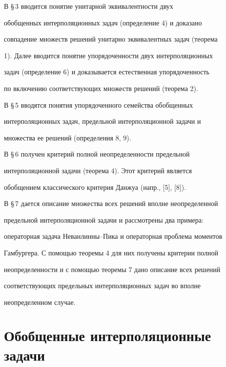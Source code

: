 В \S\,3 вводится понятие унитарной эквивалентности двух


обобщенных интерполяционных задач (определение 4) и доказано


совпадение множеств решений унитарно эквивалентных задач (теорема


1). Далее вводится понятие упорядоченности двух интерполяционных


задач (определение 6) и доказывается естественная упорядоченность


по включению соответствующих множеств решений (теорема 2).





В \S\,5 вводятся понятия упорядоченного семейства обобщенных


интерполяционных задач, предельной интерполяционной задачи и


множества ее решений (определения 8, 9).





В \S\,6 получен критерий полной неопределенности предельной


интерполяционной задачи (теорема 4). Этот критерий является


обобщением классического критерия Данжуа (напр., [5], [8]).





В \S\,7 дается описание множества всех решений вполне неопределенной


предельной интерполяционной задачи и рассмотрены два примера:


операторная задача Неванлинны--Пика и операторная проблема моментов


Гамбургера. С помощью теоремы 4 для них получены критерии полной


неопределенности и с помощью теоремы 7 дано описание всех решений


соответствующих предельных интерполяционных задач во вполне


неопределенном случае.








\section{Обобщенные интерполяционные задачи}





